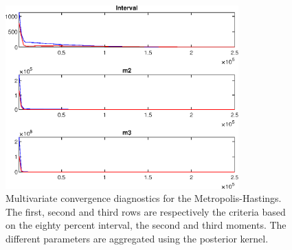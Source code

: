  
\begin{figure}[H]
\centering 
\includegraphics[width=0.8\textwidth]{BRS_extended_fd/Output/BRS_extended_fd_mdiag}
\caption{Multivariate convergence diagnostics for the Metropolis-Hastings.
The first, second and third rows are respectively the criteria based on
the eighty percent interval, the second and third moments. The different 
parameters are aggregated using the posterior kernel.}\label{Fig:MultivariateDiagnostics}
\end{figure}

